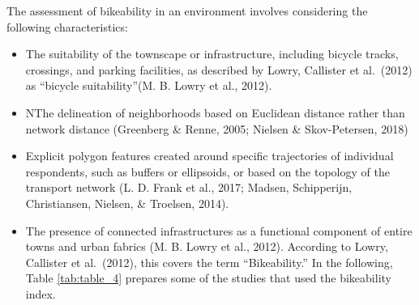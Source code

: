\documentclass[
11pt, %
oneside, %
english, %
singlespacing, %
]{macthesis} %
\begin{document}
The assessment of bikeability in an environment involves considering the following characteristics:

\begin{itemize}
\item
  The suitability of the townscape or infrastructure, including bicycle tracks, crossings, and parking facilities, as described by Lowry, Callister et al.~(2012) as ``bicycle suitability''(M. B. Lowry et al., 2012).
\item
  NThe delineation of neighborhoods based on Euclidean distance rather than network distance (Greenberg \& Renne, 2005; Nielsen \& Skov-Petersen, 2018)
\item
  Explicit polygon features created around specific trajectories of individual respondents, such as buffers or ellipsoids, or based on the topology of the transport network (L. D. Frank et al., 2017; Madsen, Schipperijn, Christiansen, Nielsen, \& Troelsen, 2014).
\item
  The presence of connected infrastructures as a functional component of entire towns and urban fabrics (M. B. Lowry et al., 2012). According to Lowry, Callister et al.~(2012), this covers the term ``Bikeability.'' In the following, Table \ref{tab:table_4} prepares some of the studies that used the bikeability index.
\end{itemize}
\end{document}
